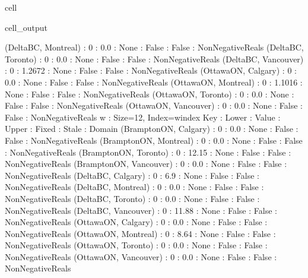 \documentclass[letterpaper,10pt,english]{jupyterBook}
\begin{document}
\begin{sphinxuseclass}{cell}
\begin{sphinxVerbatimOutput}
\begin{sphinxuseclass}{cell_output}
\begin{sphinxVerbatim}[commandchars=\\\{\}]
            (\PYGZsq{}Delta\PYGZhy{}BC\PYGZsq{}, \PYGZsq{}Montreal\PYGZsq{}) :     0 :               0.0 :  None : False : False : NonNegativeReals
             (\PYGZsq{}Delta\PYGZhy{}BC\PYGZsq{}, \PYGZsq{}Toronto\PYGZsq{}) :     0 :               0.0 :  None : False : False : NonNegativeReals
           (\PYGZsq{}Delta\PYGZhy{}BC\PYGZsq{}, \PYGZsq{}Vancouver\PYGZsq{}) :     0 :            1.2672 :  None : False : False : NonNegativeReals
            (\PYGZsq{}Ottawa\PYGZhy{}ON\PYGZsq{}, \PYGZsq{}Calgary\PYGZsq{}) :     0 :               0.0 :  None : False : False : NonNegativeReals
           (\PYGZsq{}Ottawa\PYGZhy{}ON\PYGZsq{}, \PYGZsq{}Montreal\PYGZsq{}) :     0 :            1.1016 :  None : False : False : NonNegativeReals
            (\PYGZsq{}Ottawa\PYGZhy{}ON\PYGZsq{}, \PYGZsq{}Toronto\PYGZsq{}) :     0 :               0.0 :  None : False : False : NonNegativeReals
          (\PYGZsq{}Ottawa\PYGZhy{}ON\PYGZsq{}, \PYGZsq{}Vancouver\PYGZsq{}) :     0 :               0.0 :  None : False : False : NonNegativeReals
    w : Size=12, Index=w\PYGZus{}index
        Key                          : Lower : Value : Upper : Fixed : Stale : Domain
          (\PYGZsq{}Brampton\PYGZhy{}ON\PYGZsq{}, \PYGZsq{}Calgary\PYGZsq{}) :     0 :   0.0 :  None : False : False : NonNegativeReals
         (\PYGZsq{}Brampton\PYGZhy{}ON\PYGZsq{}, \PYGZsq{}Montreal\PYGZsq{}) :     0 :   0.0 :  None : False : False : NonNegativeReals
          (\PYGZsq{}Brampton\PYGZhy{}ON\PYGZsq{}, \PYGZsq{}Toronto\PYGZsq{}) :     0 : 12.15 :  None : False : False : NonNegativeReals
        (\PYGZsq{}Brampton\PYGZhy{}ON\PYGZsq{}, \PYGZsq{}Vancouver\PYGZsq{}) :     0 :   0.0 :  None : False : False : NonNegativeReals
             (\PYGZsq{}Delta\PYGZhy{}BC\PYGZsq{}, \PYGZsq{}Calgary\PYGZsq{}) :     0 :   6.9 :  None : False : False : NonNegativeReals
            (\PYGZsq{}Delta\PYGZhy{}BC\PYGZsq{}, \PYGZsq{}Montreal\PYGZsq{}) :     0 :   0.0 :  None : False : False : NonNegativeReals
             (\PYGZsq{}Delta\PYGZhy{}BC\PYGZsq{}, \PYGZsq{}Toronto\PYGZsq{}) :     0 :   0.0 :  None : False : False : NonNegativeReals
           (\PYGZsq{}Delta\PYGZhy{}BC\PYGZsq{}, \PYGZsq{}Vancouver\PYGZsq{}) :     0 : 11.88 :  None : False : False : NonNegativeReals
            (\PYGZsq{}Ottawa\PYGZhy{}ON\PYGZsq{}, \PYGZsq{}Calgary\PYGZsq{}) :     0 :   0.0 :  None : False : False : NonNegativeReals
           (\PYGZsq{}Ottawa\PYGZhy{}ON\PYGZsq{}, \PYGZsq{}Montreal\PYGZsq{}) :     0 :  8.64 :  None : False : False : NonNegativeReals
            (\PYGZsq{}Ottawa\PYGZhy{}ON\PYGZsq{}, \PYGZsq{}Toronto\PYGZsq{}) :     0 :   0.0 :  None : False : False : NonNegativeReals
          (\PYGZsq{}Ottawa\PYGZhy{}ON\PYGZsq{}, \PYGZsq{}Vancouver\PYGZsq{}) :     0 :   0.0 :  None : False : False : NonNegativeReals


\end{sphinxVerbatim}
\end{sphinxuseclass}
\end{sphinxVerbatimOutput}
\end{sphinxuseclass}
\end{document}
